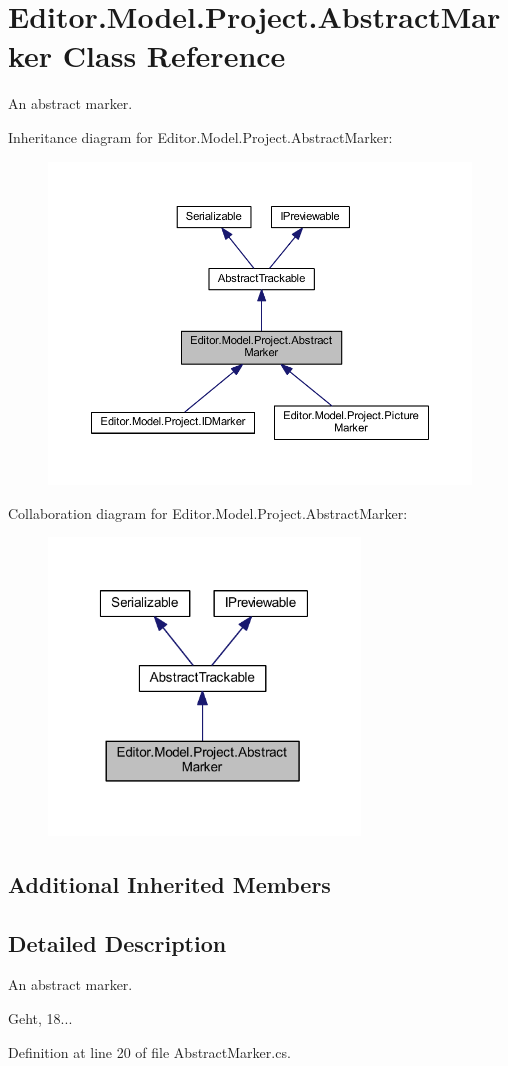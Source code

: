 \section{Editor.\-Model.\-Project.\-Abstract\-Marker Class Reference}
\label{class_editor_1_1_model_1_1_project_1_1_abstract_marker}


An abstract marker.  




Inheritance diagram for Editor.\-Model.\-Project.\-Abstract\-Marker\-:
\nopagebreak
\begin{figure}[H]
\begin{center}
\leavevmode
\includegraphics[width=350pt]{class_editor_1_1_model_1_1_project_1_1_abstract_marker__inherit__graph}
\end{center}
\end{figure}


Collaboration diagram for Editor.\-Model.\-Project.\-Abstract\-Marker\-:
\nopagebreak
\begin{figure}[H]
\begin{center}
\leavevmode
\includegraphics[width=235pt]{class_editor_1_1_model_1_1_project_1_1_abstract_marker__coll__graph}
\end{center}
\end{figure}
\subsection*{Additional Inherited Members}


\subsection{Detailed Description}
An abstract marker. 

Geht, 18... 

Definition at line 20 of file Abstract\-Marker.\-cs.

